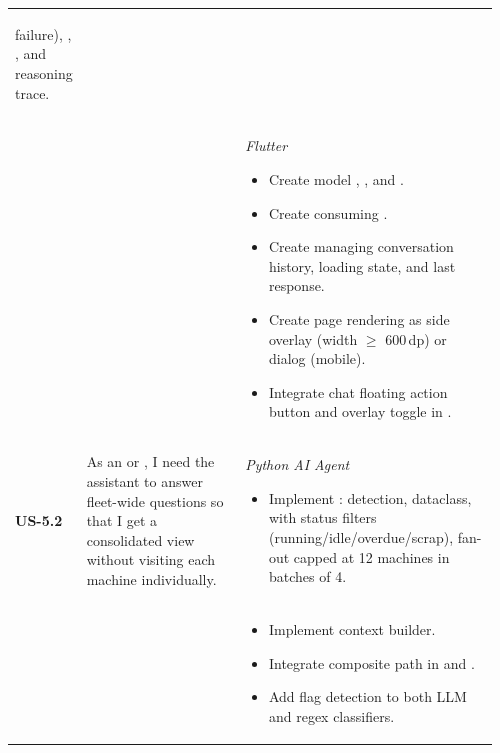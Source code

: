 \begin{longtable}{@{} P{0.09\linewidth} P{0.34\linewidth} P{0.53\linewidth} @{}}
\begin{itemize}[nosep, leftmargin=*]
          failure), , ,
          and  reasoning trace.
	\end{itemize}
\\ & &
	\noindent\textit{Flutter}
	\begin{itemize}[nosep, leftmargin=*]
		\item Create model , ,
		      and .
		\item Create  consuming .
		\item Create  managing conversation history,
		      loading state, and last response.
		\item Create page  rendering as side overlay
		      (width $\geq$ 600\,dp) or dialog (mobile).
		\item Integrate chat floating action button and overlay toggle in .
	\end{itemize}\\
	\midrule


	\textbf{US-5.2}
	& As an  or , I need the assistant
	to answer fleet-wide questions so that I get a consolidated view without
	visiting each machine individually.
	& \noindent\textit{Python AI Agent}
	\begin{itemize}[nosep, leftmargin=*]
	\item Implement : 
		      detection,  dataclass,
		       with status filters (running/idle/overdue/scrap),
		      fan-out capped at 12 machines in batches of 4.
		\end{itemize}
	\\ & &
	\begin{itemize}[nosep, leftmargin=*]
		 \item Implement  context builder.
		\item Integrate composite path in  and
		      .
		\item Add  flag detection to both LLM and regex
		      classifiers.
	\end{itemize}\\
	\midrule


\end{longtable}

